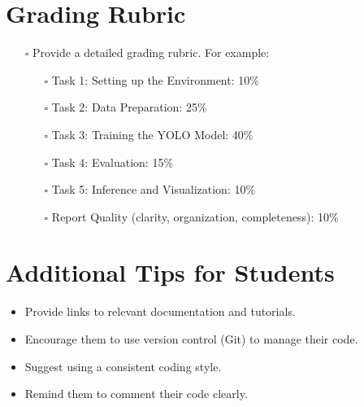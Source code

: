 \documentclass[11pt]{article}
\begin{document}
\section{Grading Rubric}
\label{sec:orgc82ee25}
\begin{itemize}
\item[{$\square$}] Provide a detailed grading rubric. For example:
\begin{itemize}
\item[{$\square$}] Task 1: Setting up the Environment: 10\%
\item[{$\square$}] Task 2: Data Preparation: 25\%
\item[{$\square$}] Task 3: Training the YOLO Model: 40\%
\item[{$\square$}] Task 4: Evaluation: 15\%
\item[{$\square$}] Task 5: Inference and Visualization: 10\%
\item[{$\square$}] Report Quality (clarity, organization,
completeness): 10\%
\end{itemize}
\end{itemize}
\section{Additional Tips for Students}
\label{sec:orgc301748}
\begin{itemize}
\item Provide links to relevant documentation and
tutorials.
\item Encourage them to use version control (Git) to manage
their code.
\item Suggest using a consistent coding style.
\item Remind them to comment their code clearly.
\end{itemize}
\end{document}
